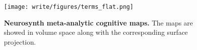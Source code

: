 \begin{figure}[!htp]
    \centering
    \texttt{[image: write/figures/terms\_flat.png]}
    \caption{\textbf{Neurosynth meta-analytic cognitive maps.} The maps are showed in volume space along with the corresponding surface projection.}
    \label{suppfig:flat_terms}
\end{figure}

\clearpage









 
 


